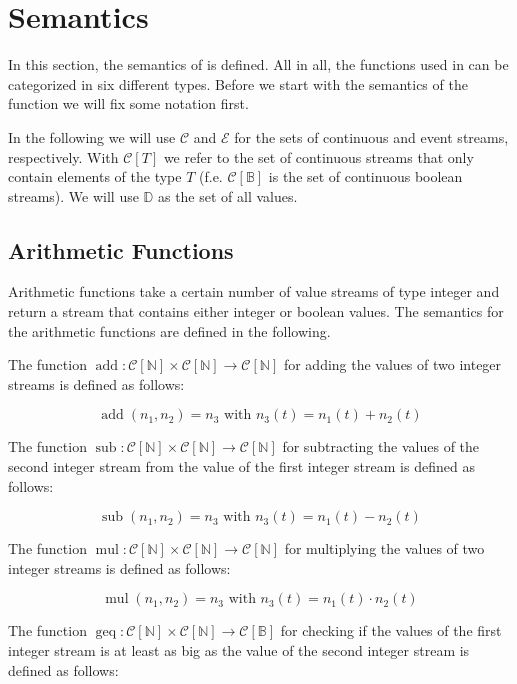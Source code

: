 \section{Semantics}

In this section, the semantics of \tessla is defined. All in all, the functions used in \tessla can be categorized in six different types. Before we start with the semantics of the function we will fix some notation first.

In the following we will use $\mathcal{C}$ and $\mathcal{E}$ for the sets of continuous and event streams, respectively. With $\mathcal{C}[T]$ we refer to the set of continuous streams that only contain elements of the type $T$ (f.e. $\mathcal{C}[\mathbb{B}]$ is the set of continuous boolean streams). We will use $\mathbb{D}$ as the set of all values.

\subsection{Arithmetic Functions}

Arithmetic functions take a certain number of value streams of type integer and return a stream that contains either integer or boolean values. The semantics for the arithmetic functions are defined in the following.

The function $\operatorname{add}: \mathcal{C}[\mathbb{N}] \times \mathcal{C}[\mathbb{N}] \rightarrow \mathcal{C}[\mathbb{N}]$ for adding the values of two integer streams is defined as follows:

\[\operatorname{add}(n_1,n_2) = n_3 \text{ with } n_3(t) = n_1(t) + n_2(t)\]

The function $\operatorname{sub}: \mathcal{C}[\mathbb{N}] \times \mathcal{C}[\mathbb{N}] \rightarrow \mathcal{C}[\mathbb{N}]$ for subtracting the values of the second integer stream from the value of the first integer stream is defined as follows:

\[\operatorname{sub}(n_1,n_2) = n_3 \text{ with } n_3(t) = n_1(t) - n_2(t)\]

The function $\operatorname{mul}: \mathcal{C}[\mathbb{N}] \times \mathcal{C}[\mathbb{N}] \rightarrow \mathcal{C}[\mathbb{N}]$ for multiplying the values of two integer streams is defined as follows:

\[\operatorname{mul}(n_1,n_2) = n_3 \text{ with } n_3(t) = n_1(t) \cdot n_2(t)\]

The function $\operatorname{geq}: \mathcal{C}[\mathbb{N}] \times \mathcal{C}[\mathbb{N}] \rightarrow \mathcal{C}[\mathbb{B}]$ for checking if the values of the first integer stream is at least as big as the value of the second integer stream is defined as follows:

